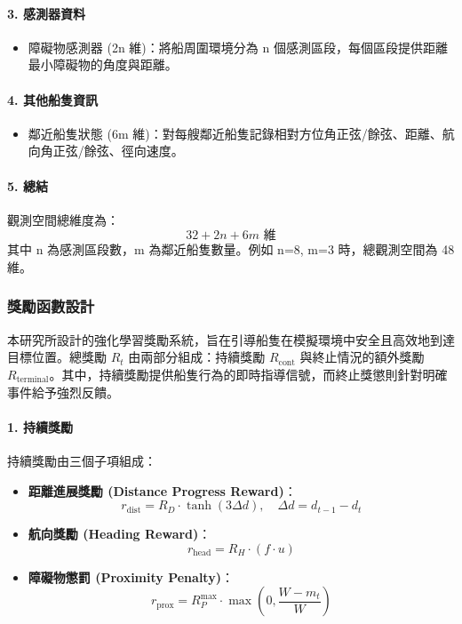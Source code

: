 \documentclass[12pt,a4paper]{article}
\begin{document}
\paragraph{3. 感測器資料}
\begin{itemize}
    \item 障礙物感測器 (2n 維)：將船周圍環境分為 n 個感測區段，每個區段提供距離最小障礙物的角度與距離。
\end{itemize}

\paragraph{4. 其他船隻資訊}
\begin{itemize}
    \item 鄰近船隻狀態 (6m 維)：對每艘鄰近船隻記錄相對方位角正弦/餘弦、距離、航向角正弦/餘弦、徑向速度。
\end{itemize}

\paragraph{5. 總結}
觀測空間總維度為：
\[
32 + 2n + 6m \text{ 維}
\]
其中 n 為感測區段數，m 為鄰近船隻數量。例如 n=8, m=3 時，總觀測空間為 48 維。

\newpage

\subsubsection{獎勵函數設計}

本研究所設計的強化學習獎勵系統，旨在引導船隻在模擬環境中安全且高效地到達目標位置。總獎勵 $R_t$ 由兩部分組成：持續獎勵 $R_{\text{cont}}$ 與終止情況的額外獎勵 $R_{\text{terminal}}$。其中，持續獎勵提供船隻行為的即時指導信號，而終止獎懲則針對明確事件給予強烈反饋。

\paragraph{1. 持續獎勵}
持續獎勵由三個子項組成：
\begin{itemize}
    \item \textbf{距離進展獎勵 (Distance Progress Reward)}：
    \[
    r_{\text{dist}} = R_D \cdot \tanh(3 \Delta d), \quad \Delta d = d_{t-1}-d_t
    \]
    \item \textbf{航向獎勵 (Heading Reward)}：
    \[
    r_{\text{head}} = R_H \cdot (f \cdot u)
    \]
    \item \textbf{障礙物懲罰 (Proximity Penalty)}：
    \[
    r_{\text{prox}} = R_P^{\max} \cdot \max\!\left(0, \frac{W - m_t}{W}\right)
    \]
\end{itemize}
\end{document}
